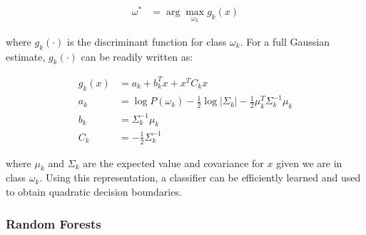 \documentclass{article}[12pt]
\begin{document}
   \begin{align*}
   \omega^* &= \arg \max_{\omega_k} g_k(x)
   \end{align*}
   
   where $g_k(\cdot)$ is the discriminant function for class $\omega_k$. For a full Gaussian estimate, $g_k(\cdot)$ can be readily written as:
   
   \begin{align*}
   g_k(x) &= a_k + b_k^T x + x^T C_k x \\
   a_k &= \log P(\omega_k) - \frac{1}{2} \log \left| \Sigma_k \right| - \frac{1}{2} \mu_k^T \Sigma_k^{-1} \mu_k \\
   b_k &= \Sigma_k^{-1} \mu_k \\
   C_k &= -\frac{1}{2} \Sigma_k^{-1}
   \end{align*}
   
   where $\mu_k$ and $\Sigma_k$ are the expected value and covariance for $x$ given we are in class $\omega_k$. Using this representation, a classifier can be efficiently learned and used to obtain quadratic decision boundaries.
   
   
   \subsubsection{Random Forests}
\end{document}
